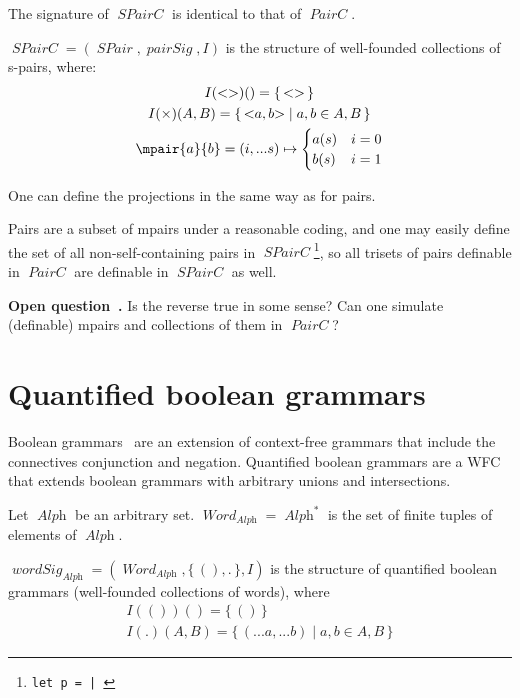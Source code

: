 \documentclass[oneside,12pt]{book}
\newcounter{question}
\newenvironment{question}{\refstepcounter{question}\par\noindent
  \textbf{\color{black}Open question~\thequestion.} \rmfamily}{}
\theoremstyle{definition}
\theoremstyle{remark}
\newcommand\var[1]{\mathop{\mathit{#1}}\nolimits}
\newcommand{\PairC}{\var{PairC}}
\newcommand{\SPair}{\var{SPair}}
\newcommand{\SPairC}{\var{SPairC}}
\newcommand{\sPair}[2]{{<}#1, #2{>}}
\newcommand{\sPairZ}{{<}{>}}
\newcommand{\Word}{\var{Word}}
\newcommand{\alphabet}{\var{Alph}}
\begin{document}
\begin{defBox}
  The signature of $\SPairC$ is identical to that of $\PairC$.
  
  \medskip \noindent $\SPairC = (\SPair, \var{pairSig}, I)$ is the structure
  of well-founded collections of s-pairs, where:
  \begin{gather*}
    I(\sPairZ)() = \{\,\sPairZ\,\} \\
    I(\times)(A, B) = \{\,\sPair{a}{b} \mid a,b \in A, B \,\} \\
    \mpair{a}{b} = ( i, ...s ) \mapsto \begin{cases}
      a(s) & i = 0 \\
      b(s) & i = 1
    \end{cases}
  \end{gather*}
\end{defBox}

One can define the projections in the same way as for pairs.

\begin{questionBox}
  Pairs are a subset of mpairs under a reasonable coding, and one may easily define
  the set of all non-self-containing pairs in $\SPairC$\footnote{%
  \texttt{let p = \mpairZ | }}, so all trisets of pairs definable
  in $\PairC$ are definable in $\SPairC$ as well.
  
  \begin{question}
    Is the reverse true in some sense? Can one simulate (definable) mpairs and
    collections of them in $\PairC$?
  \end{question}
\end{questionBox}

\section{Quantified boolean grammars}
Boolean grammars~\cite{ConBoolGrammars} are an extension of context-free grammars
that include the connectives conjunction and negation. Quantified boolean grammars
are a WFC that extends boolean grammars with arbitrary unions and intersections.

\begin{defBox}
  Let $\alphabet$ be an arbitrary set. $\Word_{\alphabet} = \alphabet^*$ is the set
  of finite tuples of elements of $\alphabet$.
  
  \medskip \noindent $\var{wordSig}_{\alphabet} = (\Word_{\alphabet}, \{\,(), .\,\}, I)$
  is the structure of quantified boolean grammars (well-founded collections of words),
  where
  \begin{gather*}
    I(())() = \{\,()\,\} \\
    I(.)(A, B) = \{\,( ...a, ...b) \mid a,b \in A, B\,\}
  \end{gather*}
\end{defBox}
\end{document}
